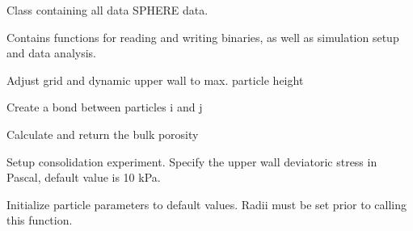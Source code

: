 \documentclass[letterpaper,10pt,english]{sphinxmanual}
\begin{document}
\begin{fulllineitems}
\label{python_api:sphere.Spherebin}
Class containing all data SPHERE data.

Contains functions for reading and writing binaries, as well as simulation
setup and data analysis.

\begin{fulllineitems}
\label{python_api:sphere.Spherebin.adjustUpperWall}
Adjust grid and dynamic upper wall to max. particle height

\end{fulllineitems}


\begin{fulllineitems}
\label{python_api:sphere.Spherebin.bond}
Create a bond between particles i and j

\end{fulllineitems}


\begin{fulllineitems}
\label{python_api:sphere.Spherebin.bulkPorosity}
Calculate and return the bulk porosity

\end{fulllineitems}


\begin{fulllineitems}
\label{python_api:sphere.Spherebin.consolidate}
Setup consolidation experiment. Specify the upper wall 
deviatoric stress in Pascal, default value is 10 kPa.

\end{fulllineitems}


\begin{fulllineitems}
\label{python_api:sphere.Spherebin.defaultParams}
Initialize particle parameters to default values.
Radii must be set prior to calling this function.


\end{fulllineitems}
\end{fulllineitems}
\end{document}
